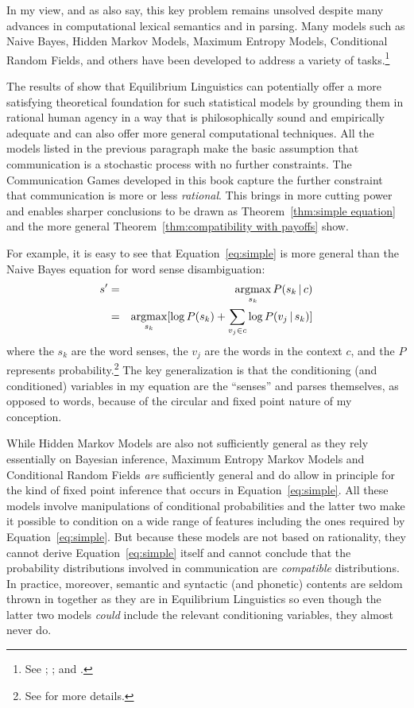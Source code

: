 In my view, and as \citet[592]{jm:slp2} also say, this key problem remains unsolved despite many advances in computational lexical semantics and in parsing. Many models such as Naive Bayes, Hidden Markov Models, Maximum Entropy Models, Conditional Random Fields, and others have been developed to address a variety of tasks.\footnote{See \citet{r:hmm,sm:crf}; \citet[Chapters~7, 9]{ms:fsnlp}; and \citet[Chapters~5, 6, 20]{jm:slp2}.} 

The results of  show that Equilibrium Linguistics can potentially offer a more satisfying theoretical foundation for such statistical models by grounding them in rational human agency in a way that is philosophically sound and empirically adequate and can also offer more general computational techniques. All the models listed in the previous paragraph make the basic assumption that communication is a stochastic process with no further constraints. The Communication Games developed in this book capture the further constraint that communication is more or less \emph{rational}. This brings in more cutting power and enables sharper conclusions to be drawn as Theorem~\ref{thm:simple equation}
and the more general Theorem~\ref{thm:compatibility with payoffs} show.

For example, it is easy to see that Equation~\ref{eq:simple} is more general than the Naive Bayes equation for word sense disambiguation:
\begin{eqnarray*}
s' & = & \operatorname*{argmax}_{s_k} P(s_k \,|\, c) \\
& = & \operatorname*{argmax}_{s_k} [\log P(s_k) + \sum_{v_j \in c} \log P(v_j \,|\, s_k)]
\end{eqnarray*}
\noindent where the $s_k$ are the word senses, the $v_j$ are the words in the context $c$, and the $P$ represents probability.\footnote{See \citet[Section~7.2.1]{ms:fsnlp} for more details.} The key generalization is that the conditioning (and conditioned) variables in my equation are the ``senses'' and parses themselves, as opposed to words, because of the circular and fixed point nature of my conception.

While Hidden Markov Models are also not sufficiently general as they rely essentially on Bayesian inference, Maximum Entropy Markov Models and Conditional Random Fields \emph{are} sufficiently general and do allow in principle for the kind of fixed point inference that occurs in Equation~\ref{eq:simple}. All these models involve manipulations of conditional probabilities and the latter two make it possible to condition on a wide range of features including the ones required by Equation~\ref{eq:simple}. But because these models are not based on rationality, they cannot derive Equation~\ref{eq:simple} itself and cannot conclude that the probability distributions involved in communication are \emph{compatible} distributions. In practice, moreover, semantic and syntactic (and phonetic) contents are seldom thrown in together as they are in Equilibrium Linguistics so even though the latter two models \emph{could} include the relevant conditioning variables, they almost never do.

